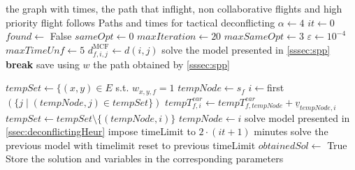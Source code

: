 \documentclass[../thesis.tex]{subfiles}
\begin{document}
\begin{algorithm}[H]
\begin{algorithmic}
\REQUIRE the graph with  times, the path that inflight, non collaborative flights and high priority flight follows 
\ENSURE Paths and times for tactical deconflicting
\STATE $\alpha\gets 4$
\STATE $it\gets 0$
\STATE $found\gets$ False
\STATE $sameOpt\gets 0$
\STATE $maxIteration\gets 20$
\STATE $maxSameOpt\gets 3$
\STATE $\varepsilon\gets 10^{-4}$
\STATE $maxTimeUnf\gets 5$
    \STATE $d^\text{MCF}_{f,i,j}\gets d(i,j)$
\ENDFOR
{}  
    \STATE solve the model presented in \ref{sssec:spp}
        \STATE \textbf{break}
    \ENDIF
    \STATE save using $w$ the path obtained by \ref{sssec:spp}
\end{algorithmic}
\end{algorithm}
\begin{algorithm}
\begin{algorithmic}
    \STATE $tempSet\gets \{(x,y)\in E$ s.t. $w_{x,y,f}=1$
    \STATE $tempNode\gets s_f$
    \STATE $i\gets $first$(\{ j \mid (tempNode, j) \in tempSet \})$
    \STATE $tempT^{ear}_{f,i}\gets tempT^{ear}_{f,tempNode}+\underline v_{tempNode,i}$
    \STATE $tempSet\gets tempSet\setminus\{(tempNode,i)\}$
    \STATE $tempNode\gets i$
    \ENDWHILE
    \ENDFOR
    \STATE solve model presented in \ref{ssec:deconflictingHeur}
    \STATE impose timeLimit to $2\cdot (it+1)$ minutes
    \STATE solve the previous model with timelimit
    \STATE reset to previous timeLimit
    \ENDIF
    \STATE $obtainedSol\gets$ True
    \STATE Store the solution and variables in the corresponding parameters
    \ENDIF
    \ENDIF
{}
    \end{algorithmic}
    \end{algorithm}
\end{document}
